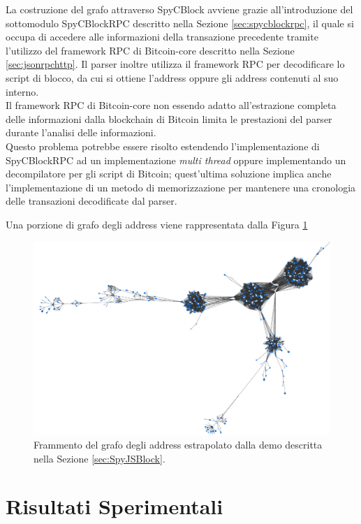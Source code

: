  La costruzione del grafo attraverso SpyCBlock avviene grazie all'introduzione del sottomodulo SpyCBlockRPC descritto nella Sezione \ref{sec:spycblockrpc}, il quale si occupa di accedere alle informazioni della transazione precedente tramite l'utilizzo del framework RPC di Bitcoin-core descritto nella Sezione \ref{sec:jsonrpchttp}.
 Il parser inoltre utilizza il framework RPC per decodificare lo script di blocco, da cui si ottiene l'address oppure gli address contenuti al suo interno.\\
 Il framework RPC di Bitcoin-core non essendo adatto all'estrazione completa delle informazioni dalla blockchain di Bitcoin limita le prestazioni del parser durante l'analisi delle informazioni.\\
 Questo problema potrebbe essere risolto estendendo l'implementazione di SpyCBlockRPC ad un implementazione \emph{multi thread} oppure implementando un decompilatore per gli script di Bitcoin; quest'ultima soluzione implica anche l'implementazione di un metodo di memorizzazione per mantenere una cronologia delle transazioni decodificate dal parser.

 Una porzione di grafo degli address viene rappresentata dalla Figura \ref{fig:addressGraph}

\begin{figure}
\centering
 \includegraphics[scale=0.25]{images/demo/address_graph.png}
 \caption{Frammento del grafo degli address estrapolato dalla demo descritta nella Sezione \ref{sec:SpyJSBlock}.}\label{fig:addressGraph}
\end{figure}

\section{Risultati Sperimentali} \label{sec:valutazionesperimentale}

